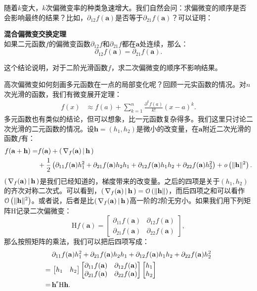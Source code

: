 \documentclass[12pt,UTF8,fontset=none]{ctexbook}
\begin{document}
随着$k$变大，$k$次偏微变率的种类急速增大。我们自然会问：求偏微变的顺序是否会影响最终的结果？比如，$\partial_{12} f(\mathbf{a})$是否等于$\partial_{21} f(\mathbf{a})$？可以证明：
\begin{tm}{\textbf{混合偏微变交换定理}}\\
    如果二元函数$f$的偏微变函数$\partial_{12} f$和$\partial_{21} f$都在$\mathbf{a}$处连续，那么：
    $$ \partial_{12} f(\mathbf{a}) = \partial_{21} f(\mathbf{a}).$$
\end{tm}
这个结论说明，对于二阶光滑函数$f$，求二次偏微变的顺序不影响结果。


高次偏微变如何刻画多元函数在一点的局部变化呢？回顾一元实函数的情况。对$n$次光滑的函数，我们有微变展开定理：
\begin{align*}
    f(x) &\approx f(a) + \sum_{k=1}^n \frac{\partial^k f (a)}{k!}(x - a)^k .
\end{align*}
多元函数也有类似的结论，但可以想象，比一元函数复杂得多。我们这里只讨论二次光滑的二元函数的情况。设$\mathbf{h} = (h_1,h_2)$是微小的改变量，在$\mathbf{a}$附近二次光滑的函数$f$有：
\begin{align*}
    f(\mathbf{a} + \mathbf{h}) = & f(\mathbf{a}) + \displaystyle\left( \,\nabla_f(\mathbf{a}) \,\middle\vert \,\mathbf{h} \,\right) \\
    &+ \frac{1}{2} \left(\partial_{11} f(\mathbf{a})h_1^2 + \partial_{21} f(\mathbf{a})h_2h_1 + \partial_{12} f(\mathbf{a})h_1h_2 + \partial_{22} f(\mathbf{a})h_2^2\right) + \mathit{o}\left(\|\mathbf{h}\|^2\right).
\end{align*}
$\displaystyle\left( \,\nabla_f(\mathbf{a}) \,\middle\vert \,\mathbf{h} \,\right)$是我们已经知道的，梯度带来的改变量。之后的四项是关于$(h_1,h_2)$的齐次对称二次式。可以看到，$\displaystyle\left( \,\nabla_f(\mathbf{a}) \,\middle\vert \,\mathbf{h} \,\right) = \mathcal{O}\left(\|\mathbf{h}\|\right)$，而后四项之和可以看作$\mathcal{O}\left(\|\mathbf{h}\|^2\right)$。或者说，后者是比$\displaystyle\left( \,\nabla_f(\mathbf{a}) \,\middle\vert \,\mathbf{h} \,\right)$高一阶的$2$阶无穷小。如果我们用下列矩阵$\mathrm{H}$记录二次偏微变：
$$
 \mathrm{H}f(\mathbf{a}) = \begin{bmatrix} \partial_{11} f(\mathbf{a}) & \partial_{12} f(\mathbf{a}) \\ \partial_{21} f(\mathbf{a}) & \partial_{22} f(\mathbf{a}) \end{bmatrix} , 
$$
那么按照矩阵的乘法，我们可以把后四项写成：
\begin{align*}
    &\partial_{11} f(\mathbf{a})h_1^2 + \partial_{21} f(\mathbf{a})h_2h_1 + \partial_{12} f(\mathbf{a})h_1h_2 + \partial_{22} f(\mathbf{a})h_2^2 \\
    =\,& \begin{bmatrix}
h_1 & h_2
\end{bmatrix}\begin{bmatrix} \partial_{11} f(\mathbf{a}) & \partial_{12} f(\mathbf{a}) \\ \partial_{21} f(\mathbf{a}) & \partial_{22} f(\mathbf{a}) \end{bmatrix} \begin{bmatrix}
h_1\\h_2
\end{bmatrix}\\
=\,&\mathbf{h}^{\tr} \mathrm{H} \mathbf{h}.
\end{align*}
\end{document}
